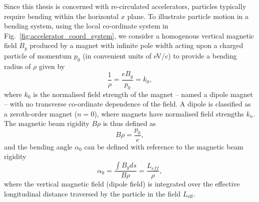 \documentclass[../main.tex]{subfiles}
\begin{document}
Since this thesis is concerned with re-circulated accelerators, particles typically require bending within the horizontal $x$ plane. To illustrate particle motion in a bending system, using the local co-ordinate system in Fig.~\ref{fig:accelerator_coord_system}, we consider a homogenous vertical magnetic field $B_{y}$ produced by a magnet with infinite pole width acting upon a charged particle of momentum $p_{0}$ (in convenient units of \si{\electronvolt}$/c$) to provide a bending radius of $\rho$ given by
\begin{equation}
\frac{1}{\rho} = \frac{eB_{y}}{p_{0}} = k_{0},
\label{magnet_bending_radius}    
\end{equation}
where $k_{0}$ is the normalised field strength of the magnet -- named a dipole magnet -- with no transverse co-ordinate dependence of the field. A dipole is classified as a zeroth-order magnet ($n=0$), where magnets have normalised field strengths $k_{n}$. The magnetic beam rigidity $B\rho$ is thus defined as
\begin{equation}
B\rho = \frac{p_{0}}{e},
\label{eq:magnetic_beam_rigidity}    
\end{equation}
and the bending angle $\alpha_{0}$ can be defined with reference to the magnetic beam rigidity
\begin{equation}
\alpha_{0} = \frac{\int B_{y} ds}{B\rho} = \frac{L_{eff}}{\rho}, 
\label{eq:dipole_bending_angle}    
\end{equation}
where the vertical magnetic field (dipole field) is integrated over the effective longitudinal distance traversed by the particle in the field $L_{\mathrm{eff}}$.
\end{document}
